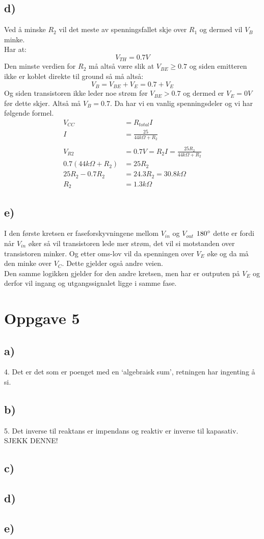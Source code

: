 \documentclass[a4paper, norsk, twoside, 10pt]{article}
\begin{document}
\subsection*{d)}
Ved å minske $R_{2}$ vil det meste av spenningsfallet skje over $R_{1}$ og dermed vil $V_{B}$ minke. \\
Har at: \[V_{TH} = 0.7V \]
Den minste verdien for $R_{2}$ må altså være slik at $V_{BE} \geq 0.7$ og siden emitteren ikke er koblet direkte til ground så må altså:
\[V_{B} = V_{BE} +V_{E} = 0.7 + V_{E}\]
Og siden transistoren ikke leder noe strøm før $V_{BE} > 0.7$ og dermed er $V_E = 0V$ før dette skjer. Altså må $V_B = 0.7$. Da har vi en vanlig spenningsdeler og vi har følgende formel.
\begin{align*}
  V_{CC} &= R_{total}I \\
  I &= \frac{25}{44k\Omega + R_2}\\
  \\
  V_{R2} &= 0.7V = R_2I = \frac{25R_2}{44k\Omega + R_2} \\
  0.7(44k\Omega + R_2) &= 25R_2 \\
  25R_2 -0.7R_2 &= 24.3R_2 = 30.8k\Omega \\
  R_2 &= 1.3k\Omega
\end{align*}


\subsection*{e)}

I den første kretsen er faseforskyvningene mellom $V_{in}$ og $V_{out}$ $180\degree$ dette er fordi når $V_{in}$ øker så vil transistoren lede mer strøm, det vil si motstanden over transistoren minker. Og etter oms-lov vil da spenningen over $V_E$ øke og da må den minke over $V_C$. Dette gjelder også andre veien.
\\
Den samme logikken gjelder for den andre kretsen, men har er outputen på $V_E$ og derfor vil ingang og utgangssignalet ligge i samme fase. 



\section*{Oppgave 5}
\subsection*{a)}
4. Det er det som er poenget med en `algebraisk sum', retningen har ingenting å si.
\subsection*{b)}
5. Det inverse til reaktans er impendans og reaktiv er inverse til kapasativ. SJEKK DENNE!
\subsection*{c)}

\subsection*{d)}

\subsection*{e)}
\end{document}

